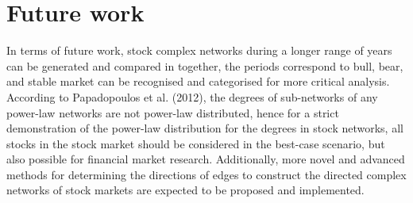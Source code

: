 \section{Future work}
In terms of future work, stock complex networks during a longer range of years can be generated and compared in together, the periods correspond to bull, bear, and stable market can be recognised and categorised for more critical analysis. According to Papadopoulos et al. (2012), the degrees of sub-networks of any power-law networks are not power-law distributed\cite{papadopoulos2012popularity}, hence for a strict demonstration of the power-law distribution for the degrees in stock networks, all stocks in the stock market should be considered in the best-case scenario, but also possible for financial market research. Additionally, more novel and advanced methods for determining the directions of edges to construct the directed complex networks of stock markets are expected to be proposed and implemented.
